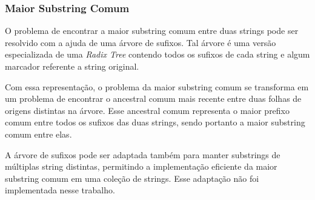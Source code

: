     \subsubsection{Maior Substring Comum}

        O problema de encontrar a maior substring comum entre duas strings pode ser resolvido com a ajuda de uma árvore de sufixos. Tal árvore é uma versão especializada de uma \textit{Radix Tree} contendo todos os sufixos de cada string e algum marcador referente a string original.

        Com essa representação, o problema da maior substring comum se transforma em um problema de encontrar o ancestral comum mais recente entre duas folhas de origens distintas na árvore. Esse ancestral comum representa o maior prefixo comum entre todos os sufixos das duas strings, sendo portanto a maior substring comum entre elas.

        A árvore de sufixos pode ser adaptada também para manter substrings de múltiplas string distintas, permitindo a implementação eficiente da maior substring comum em uma coleção de strings. Esse adaptação não foi implementada nesse trabalho.
